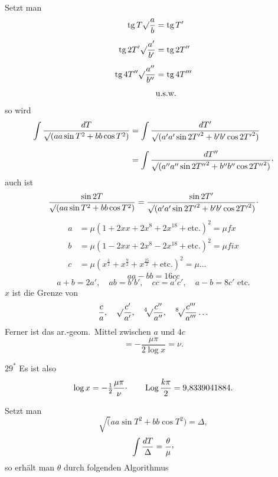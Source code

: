 \begingroup
\clearpage{}
\par\indent Setzt man
\[\begin{aligned}
\operatorname{tg}T\surd\frac ab&=\operatorname{tg}T'\\[.5em]
\operatorname{tg}2T'\surd\frac{a'}{b'}&=\operatorname{tg}2T''\\[.5em]
\operatorname{tg}4T''\surd\frac{a''}{b''}&=\operatorname{tg}4T'''\\[.4em]
&\text{u.s.w.}
\end{aligned}\]
\noindent so wird
\[\begin{aligned}
\int\frac{dT}{\surd(aa\sin T^2+bb\cos T^2)}
&=\int\frac{dT'}{\surd(a'a'\sin2{T'}^2+b'b'\cos2{T'}^2)}\\[.7em]
&=\int\frac{dT''}{\surd(a''a''\sin2{T''}^2+b''b''\cos2{T''}^2)}\mathpunct{\raisebox{.5ex}{,}}
\end{aligned}\]
\noindent auch ist
\[\frac{\sin2T}{\surd(aa\sin T^2+bb\cos T^2)}
=\frac{\sin2T'}{\surd(a'a'\sin2{T'}^2+b'b'\cos2{T'}^2)}\mathpunct{\raisebox{.5ex}{.}}\]
\[\begin{aligned}
a&=\mu(1+2xx+2x^8+2x^{18}+\text{etc.})^2=\mu fx\\[.5em]
b&=\mu(1-2xx+2x^8-2x^{18}+\text{etc.})^2=\mu fix\\[.5em]
c&=\mu(x^{\frac12}+x^{\frac92}+x^{\frac{25}2}+\text{etc.})^2=\mu\ldots
\end{aligned}\]
\[aa-bb=16cc\]
\[a+b=2a',\quad ab=b'b',\quad cc=a'c',\quad a-b=8c'\text{ etc.}\]
\noindent \(x\) ist die Grenze von
\[\frac ca,\quad\surd\frac{c'}{a'},\quad{}^4\!\surd\frac{c''}{a''},\quad{}^8\!\surd\frac{c'''}{a'''}\ldots\]
\noindent Ferner ist das ar.-geom.\ Mittel zwischen \(a\) und \(4c\)
\[=-\frac{\mu\pi}{2\log x}=\nu.\]
\par\bigskip\hfill\(29^*\)
\clearpage{}
\noindent Es ist also
\[\log x=-\tfrac12\frac{\mu\pi}{\nu}\mathpunct{\raisebox{.5ex}{.}}\qquad\operatorname{Log}\frac{k\pi}2=9{,}8339041884.\]
\par\indent Setzt man
\[\surd(aa\sin T^2+bb\cos T^2)=\Delta,\]
\[\int\frac{dT}{\Delta}=\frac\theta\mu\mathpunct{\raisebox{.5ex}{,}}\]
\noindent so erhält man \(\theta\) durch folgenden Algorithmus
